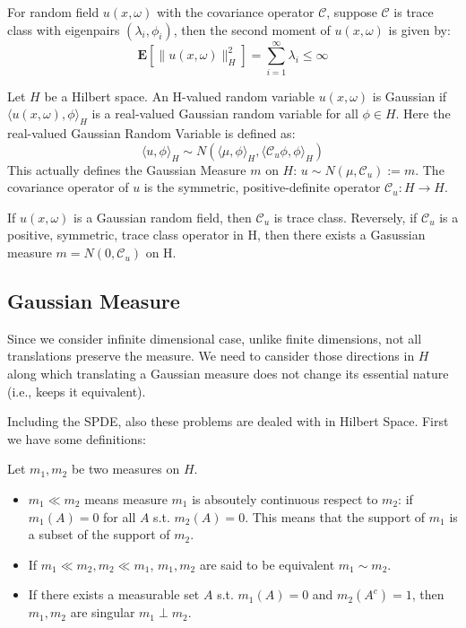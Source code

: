 \begin{definition}\label{thmtraceclass}
  For random field $u(x,\omega)$ with the covariance operator $\mathcal{C}$, suppose $\mathcal{C}$ is trace class with eigenpairs $(\lambda_i, \phi_i)$, 
  then the second moment of $u(x, \omega)$ is given by:
  \begin{equation}
    \mathbf{E}[\|u(x, \omega)\|^2_H] = \sum_{i=1}^{\infty} \lambda_i\leq \infty
  \end{equation}
\end{definition}

\begin{definition}
  Let $H$ be a Hilbert space. An H-valued random variable $u(x, \omega)$ is Gaussian if 
  $\langle u(x, \omega), \phi\rangle_H$ is a real-valued Gaussian random variable for all $\phi \in H$.
  Here the real-valued Gaussian Random Variable is defined as:
  \begin{equation}
    \langle u, \phi\rangle_H \sim N(\langle \mu, \phi\rangle_H, \langle \mathcal{C}_u\phi, \phi\rangle_H)
  \end{equation}
  This actually defines the Gaussian Measure $m$ on $H$: $u\sim N(\mu, \mathcal{C}_u):= m$. 
  The covariance operator of $u$ is the symmetric, positive-definite operator $\mathcal{C}_u : H \rightarrow H$.
\end{definition}

\begin{proposition}
  If $u(x, \omega)$ is a Gaussian random field, then $\mathcal{C}_u$ is trace class. 
  Reversely, if $\mathcal{C}_u$ is a positive, symmetric, trace class operator in H, then there exists a Gasussian measure $m=N(0, \mathcal{C}_u)$ on H.
\end{proposition}

\subsection{Gaussian Measure}
Since we consider infinite dimensional case, unlike finite dimensions, not all translations preserve the measure. 
We need to cansider those directions in $H$ along which translating a Gaussian measure does not change its essential nature (i.e., keeps it equivalent). 

Including the SPDE, also these problems are dealed with in Hilbert Space.
First we have some definitions:
\begin{definition}
  Let $m_1, m_2$ be two measures on $H$.
  \begin{itemize}
    \item $m_1 \ll m_2$ means measure $m_1$ is absoutely continuous respect to $m_2$: if $m_1(A) = 0$ for all $A$ s.t. $m_2(A) = 0$. 
     This means that the support of $m_1$ is a subset of the support of $m_2$.
    \item If $m_1 \ll m_2, m_2 \ll m_1$, $m_1, m_2$ are said to be equivalent $m_1 \sim m_2$.
    \item If there exists a measurable set $A$ s.t. $m_1(A) = 0$ and $m_2(A^c) =1$, then $m_1, m_2$ are singular $m_1 \perp m_2$. 
  \end{itemize}
\end{definition}

